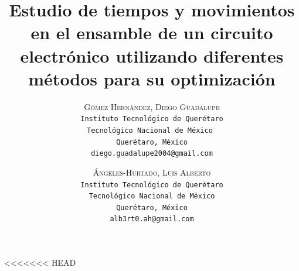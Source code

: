 <<<<<<< HEAD
    \lfoot{ \thepage}
    
    \setlength{\droptitle}{-5\baselineskip} %
    \title{\textbf{Estudio de tiempos y movimientos en el ensamble de un circuito electrónico utilizando diferentes métodos para su optimización }} %
    
     \author{ 
     \textsc{Gómez Hernández, Diego Guadalupe}\\ 
     \texttt{ Instituto Tecnológico de Querétaro } \\ 
     \texttt{Tecnológico Nacional de México } \\ 
     \texttt{Querétaro, México}\\ 
     \texttt{diego.guadalupe2004@gmail.com} 
     \and 
     \textsc{Ángeles-Hurtado, Luis Alberto}\\ 
     \texttt{ Instituto Tecnológico de Querétaro } \\ 
     \texttt{ Tecnológico Nacional de México } \\ 
     \texttt{Querétaro, México}\\ 
     \texttt{alb3rt0.ah@gmail.com} 
    }
    
    
    
    
